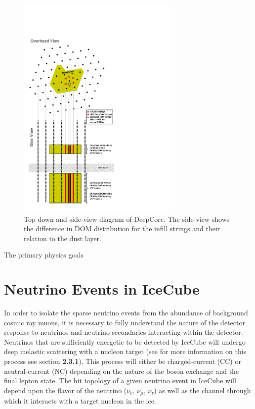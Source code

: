 \documentclass{gatech-thesis}
\begin{document}
\begin{figure}[ht]
  \begin{center}
    \includegraphics[width=0.7\textwidth,keepaspectratio]{IC86EDC_DeepCoreDiagram.pdf}
  \end{center}
  \caption{Top down and side-view diagram of DeepCore. The side-view shows the difference in DOM distribution for the infill strings and their relation to the dust layer.}
  \label{fig:DeepCoreSchematic}
\end{figure}

The primary physics goals 
\section{Neutrino Events in IceCube}

In order to isolate the sparse neutrino events from the abundance of background cosmic ray muons, it is necessary to fully understand the nature of the detector response to neutrinos and neutrino secondaries interacting within the detector. Neutrinos that are sufficiently energetic to be detected by IceCube will undergo deep inelastic scattering with a nucleon target (see for more information on this process see section \textbf{2.3.1}). This process will either be charged-current (CC) or neutral-current (NC) depending on the nature of the boson exchange and the final lepton state. The hit topology of a given neutrino event in IceCube will depend upon the flavor of the neutrino ($\nu_{e}$, $\nu_{\mu}$, $\nu_{\tau}$) as well as the channel through which it interacts with a target nucleon in the ice.
\end{document}
